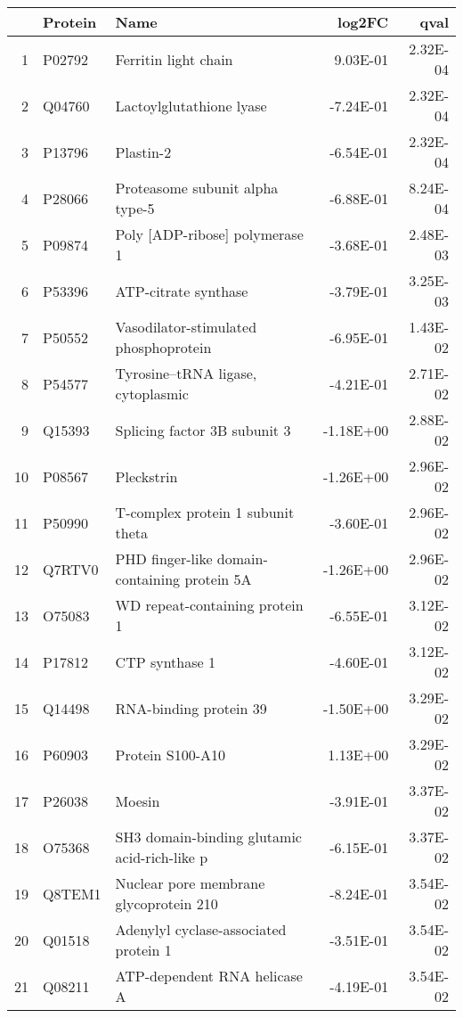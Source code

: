 \begin{table}[!h]
\centering
\begin{tabular}{rllrr}
  \hline
 & Protein & Name & log2FC & qval \\ 
  \hline
  1 & P02792 & Ferritin light chain & 9.03E-01 & 2.32E-04 \\ 
  2 & Q04760 & Lactoylglutathione lyase & -7.24E-01 & 2.32E-04 \\ 
  3 & P13796 & Plastin-2 & -6.54E-01 & 2.32E-04 \\ 
  4 & P28066 & Proteasome subunit alpha type-5 & -6.88E-01 & 8.24E-04 \\ 
  5 & P09874 & Poly [ADP-ribose] polymerase 1 & -3.68E-01 & 2.48E-03 \\ 
  6 & P53396 & ATP-citrate synthase & -3.79E-01 & 3.25E-03 \\ 
  7 & P50552 & Vasodilator-stimulated phosphoprotein & -6.95E-01 & 1.43E-02 \\ 
  8 & P54577 & Tyrosine--tRNA ligase, cytoplasmic & -4.21E-01 & 2.71E-02 \\ 
  9 & Q15393 & Splicing factor 3B subunit 3 & -1.18E+00 & 2.88E-02 \\ 
  10 & P08567 & Pleckstrin & -1.26E+00 & 2.96E-02 \\ 
  11 & P50990 & T-complex protein 1 subunit theta & -3.60E-01 & 2.96E-02 \\ 
  12 & Q7RTV0 & PHD finger-like domain-containing protein 5A & -1.26E+00 & 2.96E-02 \\ 
  13 & O75083 & WD repeat-containing protein 1 & -6.55E-01 & 3.12E-02 \\ 
  14 & P17812 & CTP synthase 1 & -4.60E-01 & 3.12E-02 \\ 
  15 & Q14498 & RNA-binding protein 39 & -1.50E+00 & 3.29E-02 \\ 
  16 & P60903 & Protein S100-A10 & 1.13E+00 & 3.29E-02 \\ 
  17 & P26038 & Moesin & -3.91E-01 & 3.37E-02 \\ 
  18 & O75368 & SH3 domain-binding glutamic acid-rich-like p & -6.15E-01 & 3.37E-02 \\ 
  19 & Q8TEM1 & Nuclear pore membrane glycoprotein 210 & -8.24E-01 & 3.54E-02 \\ 
  20 & Q01518 & Adenylyl cyclase-associated protein 1 & -3.51E-01 & 3.54E-02 \\ 
  21 & Q08211 & ATP-dependent RNA helicase A & -4.19E-01 & 3.54E-02 \\ 

\end{tabular}
\end{table}
